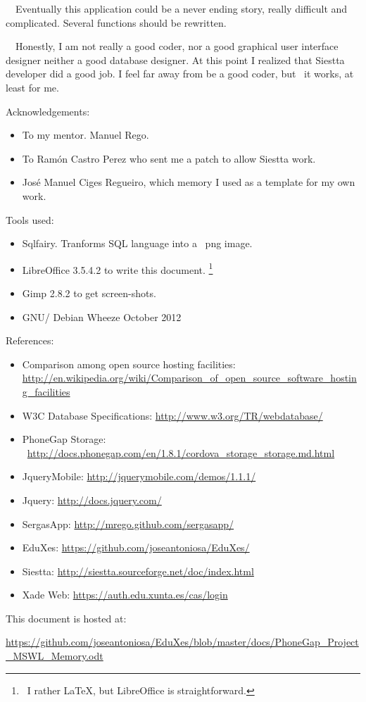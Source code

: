 \documentclass[a4paper]{article}
\begin{document}
\ \ Eventually this application could be a never ending story, really
difficult and complicated. Several functions should be rewritten.

\ \ Honestly, I am not really a good coder, nor a good graphical user
interface designer neither a good database designer. At this point I
realized that Siestta developer did a good job. I feel far away from be
a good coder, but \ it works, at least for me. \ 


\bigskip


\bigskip


\bigskip


\bigskip

\clearpage
\bigskip

Acknowledgements:

\begin{itemize}
\item To my mentor. Manuel Rego.
\item To Ramón Castro Perez who sent me a patch to allow Siestta work.
\item José Manuel Ciges Regueiro, which memory I used as a template for
my own work. \ \ \ \ \ \ \ \ \ 


\bigskip

\clearpage
\bigskip
\end{itemize}
Tools used:

\begin{itemize}
\item Sqlfairy. Tranforms SQL language into a \ png image.
\item LibreOffice 3.5.4.2 to write this document. \footnote{\ I rather
LaTeX, but LibreOffice is straightforward.} 
\item Gimp 2.8.2 to get screen-shots.
\item GNU/ Debian Wheeze October 2012 


\bigskip
\end{itemize}
References:

\begin{itemize}
\item Comparison among open source hosting facilities:
\url{http://en.wikipedia.org/wiki/Comparison_of_open_source_software_hosting_facilities}
\item W3C Database Specifications:
\url{http://www.w3.org/TR/webdatabase/}
\item PhoneGap Storage:
\ \url{http://docs.phonegap.com/en/1.8.1/cordova_storage_storage.md.html}
\item JqueryMobile: \url{http://jquerymobile.com/demos/1.1.1/}
\item Jquery: \url{http://docs.jquery.com/}
\item SergasApp: \url{http://mrego.github.com/sergasapp/}
\item EduXes: \url{https://github.com/joseantoniosa/EduXes/}
\item Siestta: \url{http://siestta.sourceforge.net/doc/index.html}
\item Xade Web: \url{https://auth.edu.xunta.es/cas/login} 
\end{itemize}

\bigskip

This document is hosted at:

\url{https://github.com/joseantoniosa/EduXes/blob/master/docs/PhoneGap_Project_MSWL_Memory.odt}
\end{document}
